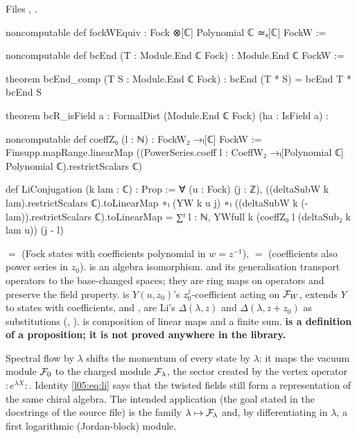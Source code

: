 \noindent Files , .
\begin{leancode}
noncomputable def fockWEquiv : Fock ⊗[ℂ] Polynomial ℂ ≃ₐ[ℂ] FockW :=

noncomputable def bcEnd (T : Module.End ℂ Fock) : Module.End ℂ FockW :=

theorem bcEnd_comp (T S : Module.End ℂ Fock) :
    bcEnd (T * S) = bcEnd T * bcEnd S

theorem bcR_isField {a : FormalDist (Module.End ℂ Fock)} (ha : IsField a) :

noncomputable def coeffZ₀ (l : ℕ) : FockW₂ →ₗ[ℂ] FockW :=
  Finsupp.mapRange.linearMap
    ((PowerSeries.coeff l : CoeffW₂ →ₗ[Polynomial ℂ] Polynomial ℂ).restrictScalars ℂ)

def LiConjugation (k lam : ℂ) : Prop :=
  ∀ (u : Fock) (j : ℤ),
    ((deltaSubW k lam).restrictScalars ℂ).toLinearMap ∘ₗ (YW k u j) ∘ₗ
        ((deltaSubW k (-lam)).restrictScalars ℂ).toLinearMap
      = ∑ᶠ l : ℕ, YWfull k (coeffZ₀ l (deltaSub₂ k lam u)) (j - l)
\end{leancode}

\begin{dictionary}
 $=$  (Fock states with coefficients polynomial in $w=z^{-1}$),
 $=$  (coefficients also power series in $z_0$).
 is an algebra isomorphism.  and its generalisation  transport operators to the
base-changed spaces; they are ring maps on operators and preserve the field property.  is
$Y(u,z_0)$'s $z_0^j$-coefficient acting on $\mathcal{F}_W$,  extends $Y$ to states with coefficients, and
,  are Li's $\Delta(\lambda,z)$ and $\Delta(\lambda,z+z_0)$ as substitutions
(, ).  is composition of linear maps and  a finite sum.
\textbf{ is a definition of a proposition; it is not proved anywhere in the library.}
\end{dictionary}

\begin{physics}
Spectral flow by $\lambda$ shifts the momentum of every state by $\lambda$: it maps the vacuum module $\mathcal{F}_0$ to the charged
module $\mathcal{F}_\lambda$, the sector created by the vertex operator ${:}e^{\lambda X}{:}$. Identity \eqref{l05:eq:li} says that the
twisted fields still form a representation of the same chiral algebra. The intended application (the goal stated in the docstrings of
the source file) is the family $\lambda\mapsto\mathcal{F}_\lambda$ and, by differentiating in $\lambda$, a first logarithmic (Jordan-block)
module.
\end{physics}

